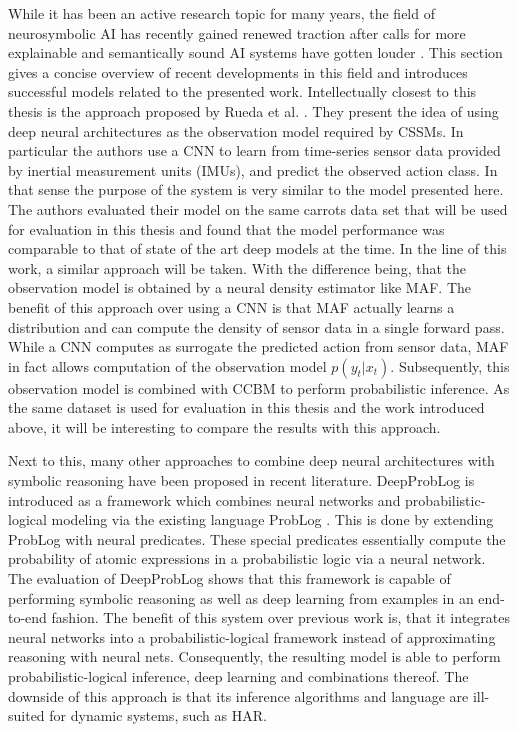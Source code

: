 \documentclass[11pt,titlepage,oneside,openany]{book}
\begin{document}
While it has been an active research topic for many years, the field of neurosymbolic AI has recently gained renewed traction after calls for more explainable and semantically sound AI systems have gotten louder \cite{garcez_neurosymbolic_2020}. This section gives a concise overview of recent developments in this field and introduces successful models related to the presented work.
Intellectually closest to this thesis is the approach proposed by Rueda et al. \cite{rueda_combining_2019}. They present the idea of using deep neural architectures as the observation model required by CSSMs. In particular the authors use a CNN to learn from time-series sensor data provided by inertial measurement units (IMUs), and predict the observed action class. In that sense the purpose of the system is very similar to the model presented here. The authors evaluated their model on the same carrots data set that will be used for evaluation in this thesis and found that the model performance was comparable to that of state of the art deep models at the time. In the line of this work, a similar approach will be taken. With the difference being, that the observation model is obtained by a neural density estimator like MAF. The benefit of this approach over using a CNN is that MAF actually learns a distribution and can compute the density of sensor data in a single forward pass. While a CNN computes as surrogate the predicted action from sensor data, MAF in fact allows computation of the observation model $p(y_t|x_t)$. Subsequently, this observation model is combined with CCBM to perform probabilistic inference. As the same dataset is used for evaluation in this thesis and the work introduced above, it will be interesting to compare the results with this approach.

Next to this, many other approaches to combine deep neural architectures with symbolic reasoning have been proposed in recent literature. DeepProbLog \cite{manhaeve_deepproblog_2018} is introduced as a framework which combines neural networks and probabilistic-logical modeling via the existing language ProbLog \cite{raedt_problog_nodate}. This is done by extending ProbLog with neural predicates. These special predicates essentially compute the probability of atomic expressions in a probabilistic logic via a neural network. The evaluation of DeepProbLog shows that this framework is capable of performing symbolic reasoning as well as deep learning from examples in an end-to-end fashion. The benefit of this system over previous work is, that it integrates neural networks into a probabilistic-logical framework instead of approximating reasoning with neural nets. Consequently, the resulting model is able to perform probabilistic-logical inference, deep learning and combinations thereof. The downside of this approach is that its inference algorithms and language are ill-suited for dynamic systems, such as HAR.
\end{document}

